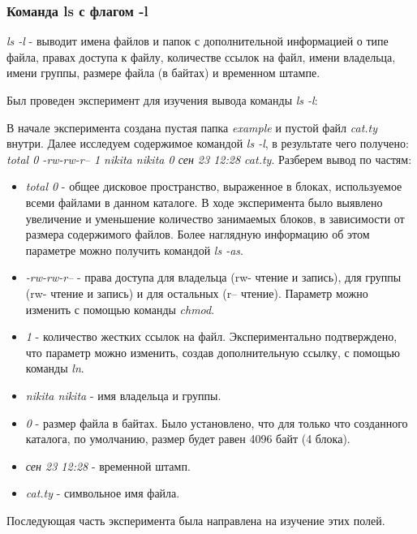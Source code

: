 \documentclass[14pt,a4paper,report]{report}
\begin{document}
\clearpage

\subsubsection{Команда ls с флагом -l}

\emph{ls -l} - выводит имена файлов и папок с дополнительной информацией о типе файла, правах доступа к файлу, количестве ссылок на файл, имени владельца, имени группы, размере файла (в байтах) и временном штампе.

Был проведен эксперимент для изучения вывода команды \emph{ls -l}:



В начале эксперимента создана пустая папка \emph{example} и пустой файл \emph{cat.ty} внутри. Далее исследуем содержимое командой \emph{ls -l}, в результате чего получено: \emph{total 0 -rw-rw-r-- 1 nikita nikita 0 сен 23 12:28 cat.ty}. Разберем вывод по частям:

\begin{itemize}
	\item \emph{total 0} - общее дисковое пространство, выраженное в блоках, используемое всеми файлами в данном каталоге. В ходе эксперимента было выявлено увеличение и уменьшение количество занимаемых блоков, в зависимости от размера содержимого файлов. Более наглядную информацию об этом параметре можно получить командой \emph{ls -as}.
	\item \emph{-rw-rw-r--} - права доступа для владельца (rw- чтение и запись), для группы (rw- чтение и запись) и для остальных (r-- чтение). Параметр можно изменить с помощью команды \emph{chmod}.
	\item \emph{1} - количество жестких ссылок на файл. Экспериментально подтверждено, что параметр можно изменить, создав дополнительную ссылку, с помощью команды \emph{ln}.
	\item \emph{nikita nikita} - имя владельца и группы.
	\item \emph{0} - размер файла в байтах. Было установлено, что для только что созданного каталога, по умолчанию, размер будет равен 4096 байт (4 блока).
	\item \emph{сен 23 12:28} - временной  штамп.
	\item \emph{cat.ty} - символьное имя файла.
\end{itemize}

Последующая часть эксперимента была направлена на изучение этих полей.

\clearpage
\end{document}
